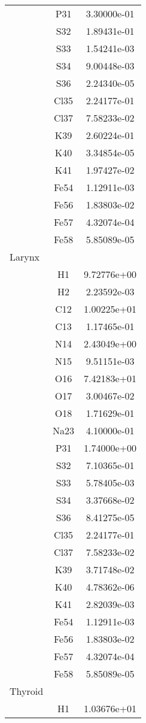\begin{centering}
\begin{longtable}{l c c}
& P31 & 3.30000e-01 \\ 
& S32 & 1.89431e-01 \\ 
& S33 & 1.54241e-03 \\ 
& S34 & 9.00448e-03 \\ 
& S36 & 2.24340e-05 \\ 
& Cl35 & 2.24177e-01 \\ 
& Cl37 & 7.58233e-02 \\ 
& K39 & 2.60224e-01 \\ 
& K40 & 3.34854e-05 \\ 
& K41 & 1.97427e-02 \\ 
& Fe54 & 1.12911e-03 \\ 
& Fe56 & 1.83803e-02 \\ 
& Fe57 & 4.32074e-04 \\ 
& Fe58 & 5.85089e-05 \\ 
\hline
Larynx & & \\
\hline
& H1 & 9.72776e+00 \\ 
& H2 & 2.23592e-03 \\ 
& C12 & 1.00225e+01 \\ 
& C13 & 1.17465e-01 \\ 
& N14 & 2.43049e+00 \\ 
& N15 & 9.51151e-03 \\ 
& O16 & 7.42183e+01 \\ 
& O17 & 3.00467e-02 \\ 
& O18 & 1.71629e-01 \\ 
& Na23 & 4.10000e-01 \\ 
& P31 & 1.74000e+00 \\ 
& S32 & 7.10365e-01 \\ 
& S33 & 5.78405e-03 \\ 
& S34 & 3.37668e-02 \\ 
& S36 & 8.41275e-05 \\ 
& Cl35 & 2.24177e-01 \\ 
& Cl37 & 7.58233e-02 \\ 
& K39 & 3.71748e-02 \\ 
& K40 & 4.78362e-06 \\ 
& K41 & 2.82039e-03 \\ 
& Fe54 & 1.12911e-03 \\ 
& Fe56 & 1.83803e-02 \\ 
& Fe57 & 4.32074e-04 \\ 
& Fe58 & 5.85089e-05 \\ 
\hline
Thyroid & & \\
\hline
& H1 & 1.03676e+01 \\ 

\end{longtable}
\end{centering}
